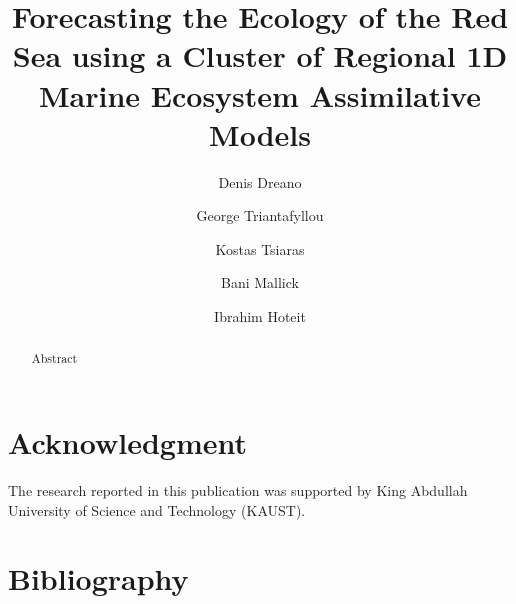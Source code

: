 \documentclass[review, authoryear]{elsarticle}
\begin{document}
\begin{frontmatter}

  \title{Forecasting the Ecology of the Red Sea using a Cluster of Regional
1D Marine Ecosystem Assimilative Models}

  \author[1]{Denis Dreano}

  \author[3]{George Triantafyllou}

  \author[3]{Kostas Tsiaras}

  \author[2]{Bani Mallick}
  
  \author[1]{Ibrahim Hoteit}
   


  \address[1]{Computer, Electrical and Mathematical Sciences and Engineering Division, King Abdullah University of Science and Technology}

  \address[2]{Department of Statistics, Texas A\&M University}

  \address[3]{Hellenic Center for Marine Research}

  \begin{abstract}
  Abstract
  \end{abstract}

\end{frontmatter}

\linenumbers











\section*{Acknowledgment}

The research reported in this publication was supported by King Abdullah
University of Science and Technology (KAUST).

\section{Bibliography}

 
\end{document}
